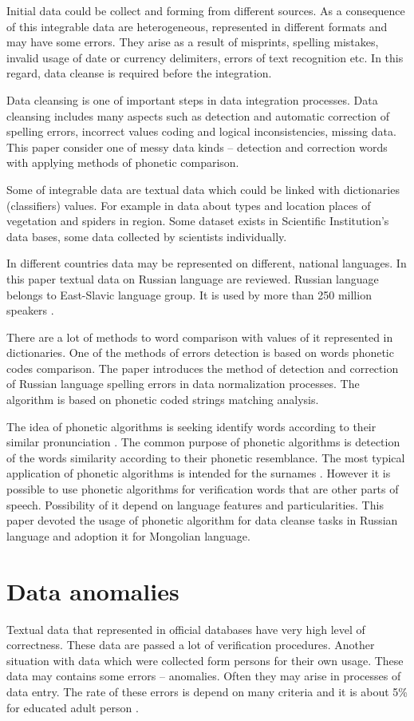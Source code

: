 \documentclass[conference,a4paper]{IEEEtran}
\begin{document}
Initial data could be collect and forming from different sources. As a consequence of this integrable data are heterogeneous, represented in different formats and may have some errors. They arise as a result of misprints, spelling mistakes, invalid usage of date or currency delimiters, errors of text recognition etc. In this regard, data cleanse is required before the integration.

Data cleansing is one of important steps in data integration processes. Data cleansing includes many aspects such as detection and automatic correction of spelling errors, incorrect values coding and logical inconsistencies, missing data. This paper consider one of messy data kinds -- detection and correction words with applying methods of phonetic comparison.

Some of integrable data are textual data which could be linked with dictionaries (classifiers) values. For example in data about types and location places of vegetation and spiders in region. Some dataset exists in Scientific Institution's data bases, some data collected by scientists individually.

In different countries data may be represented on different, national languages. In this paper textual data on Russian language are reviewed. Russian language belongs to East-Slavic language group. It is used by more than 250 million speakers \cite{Cubberley-2002}.

There are a lot of methods to word comparison with values of it represented in dictionaries. One of the methods of errors detection is based on words phonetic codes comparison. The paper introduces the method of detection and correction of Russian language spelling errors in data normalization processes. The algorithm is based on phonetic coded strings matching analysis.

The idea of phonetic algorithms is seeking identify words according to their similar pronunciation \cite{Parmar-2014}. The common purpose of phonetic algorithms is detection of the words similarity according to their phonetic resemblance. The most typical application of phonetic algorithms is intended for the surnames \cite{Zahoransky-2015}. However it is possible to use phonetic algorithms for verification words that are other parts of speech. Possibility of it depend on language features and particularities. This paper devoted the usage of phonetic algorithm for data cleanse tasks in Russian language and adoption it for Mongolian language.

\section{Data anomalies}
Textual data that represented in official databases have very high level of correctness. These data are passed a lot of verification procedures. Another situation with data which were collected form persons for their own usage. These data may contains some errors – anomalies. Often they may arise in processes of data entry. The rate of these errors is depend on many criteria and it is about 5\% for educated adult person \cite{Orr-1998}.
\end{document}
